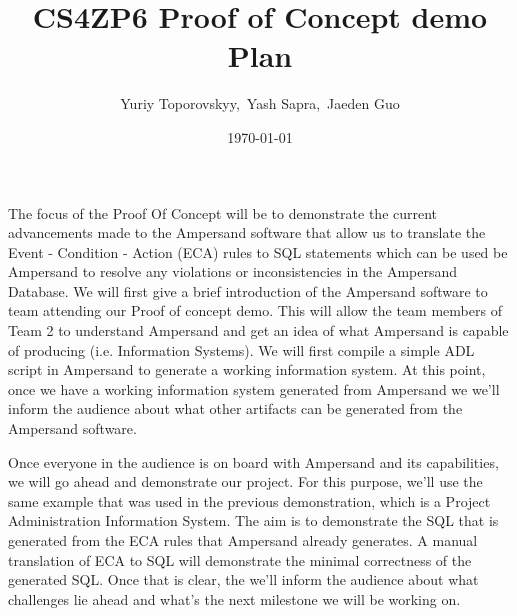 \documentclass[12pt]{article}
\begin{document}
\title{CS4ZP6 Proof of Concept demo Plan\\ \vspace{2ex}} 
\author{\normalsize{Yuriy Toporovskyy,\ Yash Sapra,\ Jaeden Guo}}
\date{\normalsize\today \vspace{1ex}}
\thispagestyle{empty}
\maketitle
\paragraph{}

The focus of the Proof Of Concept will be to demonstrate the current advancements made to the Ampersand software that allow us to translate the Event - Condition - Action (ECA) rules to SQL statements which can be used be Ampersand to resolve any violations or inconsistencies in the Ampersand Database.
\newline\newline
\indent We will first give a brief introduction of the Ampersand software to team attending our Proof of concept demo. This will allow the team members of Team 2 to understand Ampersand and get an idea of what Ampersand is capable of producing (i.e. Information Systems). We will first compile a simple ADL script in Ampersand to generate a working
information system. At this point, once we have a working information system generated from Ampersand we we'll inform the audience about what other artifacts can be generated from the Ampersand software.

Once everyone in the audience is on board with Ampersand and its capabilities, we will go ahead and demonstrate our project. For this purpose, we'll use the same example that was used in the previous demonstration, which is a Project Administration Information System. The aim is to demonstrate the SQL that is generated from the ECA rules that Ampersand already generates. A manual translation of ECA to SQL will demonstrate the minimal correctness of the generated SQL. Once that is clear, the we'll inform the audience about what challenges lie ahead and what's the next milestone we will be working on.
\end{document}

